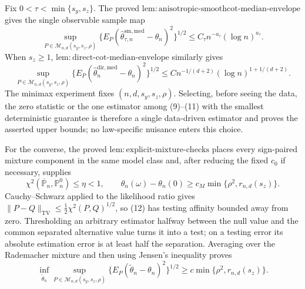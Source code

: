 Fix \(0<\tau<\min\{s_y,s_z\}\). The proved \(\mathrm{lem{:}anisotropic\text{-}smoothcot\text{-}median\text{-}envelope}\) gives the single observable sample map
\[
\sup_{P\in\mathcal M_{n,d}(s_y,s_z,\rho)}
\{E_P(\widehat\theta^{\mathrm{sm,med}}_{\tau,n}-\theta_n)^2\}^{1/2}
\le C_\tau n^{-a_\tau}(\log n)^{a_\tau}.                         \tag{10}
\]
When \(s_z\ge1\), \(\mathrm{lem{:}direct\text{-}cot\text{-}median\text{-}envelope}\) similarly gives
\[
\sup_{P\in\mathcal M_{n,d}(s_y,s_z,\rho)}
\{E_P(\widehat\theta_n^{\mathrm{dir,med}}-\theta_n)^2\}^{1/2}
\le C n^{-1/(d+2)}(\log n)^{1+1/(d+2)}.                            \tag{11}
\]
The minimax experiment fixes \((n,d,s_y,s_z,\rho)\). Selecting, before seeing the data, the zero statistic or the one estimator among (9)--(11) with the smallest deterministic guarantee is therefore a single data-driven estimator and proves the asserted upper bounds; no law-specific nuisance enters this choice.

For the converse, the proved \(\mathrm{lem{:}explicit\text{-}mixture\text{-}checks}\) places every sign-paired mixture component in the same model class and, after reducing the fixed \(c_0\) if necessary, supplies
\[
\chi^2(\overline{\mathbb P}_n,\mathbb P_n^0)\le\eta<1,
\qquad
\theta_n(\omega)-\theta_n(0)\ge c_M\min\{\rho^2,r_{n,d}(s_z)\}.  \tag{12}
\]
Cauchy--Schwarz applied to the likelihood ratio gives \(\|P-Q\|_{\mathrm{TV}}\le\frac12\chi^2(P,Q)^{1/2}\), so (12) has testing affinity bounded away from zero. Thresholding an arbitrary estimator halfway between the null value and the common separated alternative value turns it into a test; on a testing error its absolute estimation error is at least half the separation. Averaging over the Rademacher mixture and then using Jensen's inequality proves
\[
\inf_{\widetilde\theta_n}\sup_{P\in\mathcal M_{n,d}(s_y,s_z,\rho)}
\{E_P(\widetilde\theta_n-\theta_n)^2\}^{1/2}
\ge c\min\{\rho^2,r_{n,d}(s_z)\}.                                 \tag{13}
\]

